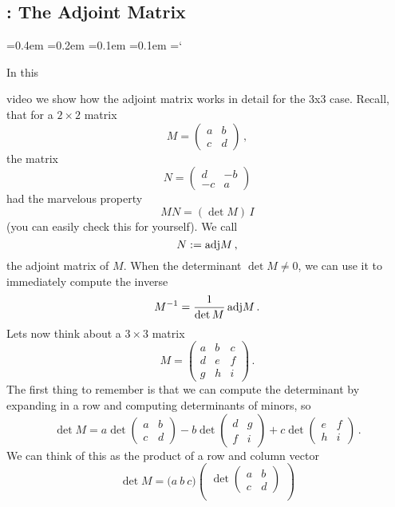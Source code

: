 
\subsection{ \propDetTitle: The Adjoint Matrix}

{\ttfamily
{}\font=0.4em
\font=0.2em
\font=0.1em
\font=0.1em
\hyphenchar\font=`\-





\hypertarget{video_properties_of_determinant_adjoint}{In this} video we show how the adjoint 
matrix works in detail for the 3x3 case. Recall, that for a $2\times 2$ matrix
\[
M=\begin{pmatrix}a&b\\c&d\end{pmatrix}\, ,
\]
the matrix
\[
N=\begin{pmatrix}d&-b\\ -c & a\end{pmatrix}
\]
had the marvelous property
\[
MN=(\det M)\, I
\]
(you can easily check this for yourself). We call \[N:={\rm adj} M\, ,\] the 
adjoint matrix of $M$. When the determinant $\det M\neq 0$, we can use it to immediately compute the inverse
\[
M^{-1}=\frac{1}{\det M}\, {\rm adj}M\, .
\]
Lets now think about a $3\times 3$ matrix 
\[
M=\begin{pmatrix}
a &b&c\\d&e&f\\g&h&i\end{pmatrix}\, .
\]
The first thing to remember is that we can compute the determinant by expanding in a row and computing determinants of minors, so
\[
\det M = a \det\begin{pmatrix}a&b\\c&d\end{pmatrix}
-b\det\begin{pmatrix}d&g\\f&i\end{pmatrix}
+c\det\begin{pmatrix}e&f\\h&i\end{pmatrix}\, .
\]
We can think of this as the product of a row and column vector
\[
\det M = \Big( a \ b \ c \Big)
\begin{pmatrix} \det\begin{pmatrix}a&b\\c&d\end{pmatrix}\\[2mm]

\end{pmatrix}\]}
